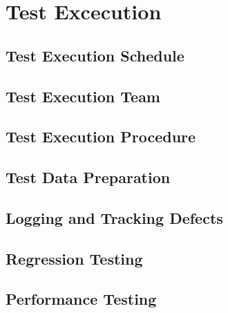 \chapter{Test Excecution}

\section{Test Execution Schedule}
\section{Test Execution Team}
\section{Test Execution Procedure}
\section{Test Data Preparation}
\section{Logging and Tracking Defects}
\section{Regression Testing}
\section{Performance Testing}







